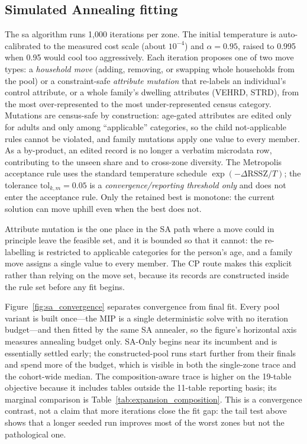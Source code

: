 \documentclass[review]{elsarticle}
\begin{document}
\subsection{Simulated Annealing fitting}
\label{sec:saextended}
\label{sec:sa}
The \gls{sa} algorithm runs 1{,}000 iterations per zone. The initial temperature is auto-calibrated to the measured cost scale (about $10^{-4}$) and $\alpha=0.95$, raised to 0.995 when 0.95 would cool too aggressively. Each iteration proposes one of two move types: a \emph{household move} (adding, removing, or swapping whole households from the pool) or a constraint-safe \emph{attribute mutation} that re-labels an individual's control attribute, or a whole family's dwelling attributes (VEHRD, STRD), from the most over-represented to the most under-represented census category. Mutations are census-safe by construction: age-gated attributes are edited only for adults and only among ``applicable'' categories, so the child not-applicable rules cannot be violated, and family mutations apply one value to every member. As a by-product, an edited record is no longer a verbatim microdata row, contributing to the unseen share and to cross-zone diversity. The Metropolis acceptance rule uses the standard temperature schedule $\exp(-\Delta\text{RSSZ}/T)$; the tolerance $\text{tol}_{k,m}=0.05$ is a \emph{convergence/reporting threshold only} and does not enter the acceptance rule. Only the retained best is monotone: the current solution can move uphill even when the best does not.

Attribute mutation is the one place in the SA path where a move could in principle leave the feasible set, and it is bounded so that it cannot: the re-labelling is restricted to applicable categories for the person's age, and a family move assigns a single value to every member. The CP route makes this explicit rather than relying on the move set, because its records are constructed inside the rule set before any fit begins.

Figure~\ref{fig:sa_convergence} separates convergence from final fit. Every pool
variant is built once---the MIP is a single deterministic solve with no iteration
budget---and then fitted by the same SA annealer, so the figure's horizontal axis
measures annealing budget only. SA-Only begins near its incumbent and is
essentially settled early; the constructed-pool runs start further from their
finals and spend more of the budget, which is visible in both the single-zone
trace and the cohort-wide median. The composition-aware trace is higher on the
19-table objective because it includes tables outside the 11-table reporting
basis; its marginal comparison is Table~\ref{tab:expansion_composition}. This is
a convergence contrast, not a claim that more iterations close the fit gap: the
tail test above shows that a longer seeded run improves most of the worst zones
but not the pathological one.
\end{document}
